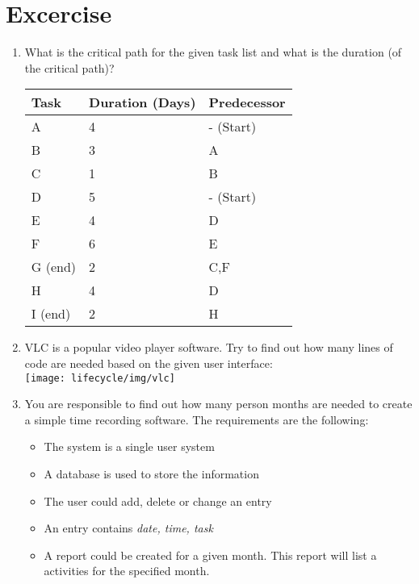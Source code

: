 \section{Excercise}

\begin{enumerate}
\item What is the critical path for the given task list and what is the duration (of the critical path)?
\begin{tabular}{l|l|l}
Task & Duration (Days) & Predecessor\\
\hline
A & 4 & - (Start)\\
B & 3 & A\\
C & 1 & B\\
D & 5 & - (Start)\\
E & 4 & D\\
F & 6 & E\\
G (end) & 2 & C,F\\
H & 4 & D\\
I (end) & 2 & H
\end{tabular}

\item VLC is a popular video player software. Try to find out how many lines
of code are needed based on the given user interface:\\
\vspace{3mm}
\texttt{[image: lifecycle/img/vlc]}

\item You are responsible to find out how many person months are needed to
create a simple time recording software. The requirements are the following:

\begin{itemize}
\item The system is a single user system
\item A database is used to store the information
\item The user could add, delete or change an entry
\item An entry contains \emph{date, time, task}
\item A report could be created for a given month. This report will list
a activities for the specified month.
\end{itemize}

\end{enumerate}
